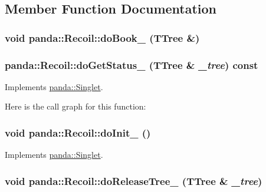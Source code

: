 \subsection{Member Function Documentation}
\hypertarget{classpanda_1_1Recoil_a95cbff28d37c2ec9995210ef0821d351}{
\subsubsection[{doBook\_\-}]{\setlength{\rightskip}{0pt plus 5cm}void panda::Recoil::doBook\_\- (TTree \&)}}
\label{classpanda_1_1Recoil_a95cbff28d37c2ec9995210ef0821d351}
\hypertarget{classpanda_1_1Recoil_ad20acbe1a9a80eabffbab6bca8d99d24}{
\subsubsection[{doGetStatus\_\-}]{ panda::Recoil::doGetStatus\_\- (TTree \& {\em \_\-tree}) const}}
\label{classpanda_1_1Recoil_ad20acbe1a9a80eabffbab6bca8d99d24}


Implements \hyperlink{classpanda_1_1Singlet_ad2749c2f28a2970eda99db906a116881}{panda::Singlet}.

Here is the call graph for this function:\hypertarget{classpanda_1_1Recoil_a5f402f90e82af5ced6c1bc0be412e1a8}{
\subsubsection[{doInit\_\-}]{\setlength{\rightskip}{0pt plus 5cm}void panda::Recoil::doInit\_\- ()}}
\label{classpanda_1_1Recoil_a5f402f90e82af5ced6c1bc0be412e1a8}


Implements \hyperlink{classpanda_1_1Singlet_af5afe7bf7b223c51d1763953ac24d261}{panda::Singlet}.\hypertarget{classpanda_1_1Recoil_aafbaf725b3422789edfa8eb17e6f7a52}{
\subsubsection[{doReleaseTree\_\-}]{\setlength{\rightskip}{0pt plus 5cm}void panda::Recoil::doReleaseTree\_\- (TTree \& {\em \_\-tree})}}
\label{classpanda_1_1Recoil_aafbaf725b3422789edfa8eb17e6f7a52}


